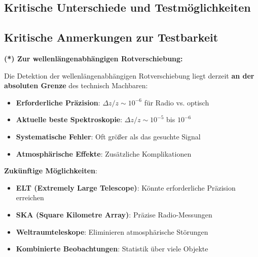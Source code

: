 \subsection{Kritische Unterschiede und Testmöglichkeiten}
\label{subsec:critical_differences}

\begin{table}[h]
	\centering
	\caption{Fundamentale Unterschiede zwischen $\Lambda$CDM und T0}
\end{table}

\subsection{Kritische Anmerkungen zur Testbarkeit}
\label{subsec:testability_notes}

\textbf{(*) Zur wellenlängenabhängigen Rotverschiebung:}

Die Detektion der wellenlängenabhängigen Rotverschiebung liegt derzeit \textbf{an der absoluten Grenze} des technisch Machbaren:

\begin{itemize}
	\item \textbf{Erforderliche Präzision}: $\Delta z/z \sim 10^{-6}$ für Radio vs. optisch
	\item \textbf{Aktuelle beste Spektroskopie}: $\Delta z/z \sim 10^{-5}$ bis $10^{-6}$
	\item \textbf{Systematische Fehler}: Oft größer als das gesuchte Signal
	\item \textbf{Atmosphärische Effekte}: Zusätzliche Komplikationen
\end{itemize}

\textbf{Zukünftige Möglichkeiten}:
\begin{itemize}
	\item \textbf{ELT (Extremely Large Telescope)}: Könnte erforderliche Präzision erreichen
	\item \textbf{SKA (Square Kilometre Array)}: Präzise Radio-Messungen
	\item \textbf{Weltraumteleskope}: Eliminieren atmosphärische Störungen
	\item \textbf{Kombinierte Beobachtungen}: Statistik über viele Objekte
\end{itemize}

